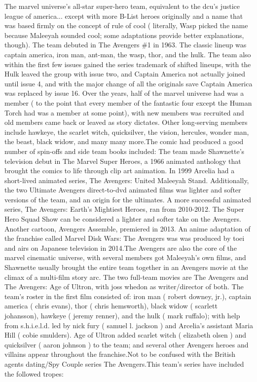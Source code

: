 \documentclass[12pt]{book}
\begin{document}
The marvel universe's all-star super-hero team, equivalent to the dcu's justice league of america... except with more B-List heroes originally and a name that was based firmly on the concept of rule of cool ( literally, Wasp picked the name because Maleeyah sounded cool; some adaptations provide better explanations, though). The team debuted in The Avengers \#1 in 1963. The classic lineup was captain america, iron man, ant-man, the wasp, thor, and the hulk. The team also within the first few issues gained the series trademark of shifted lineups, with the Hulk leaved the group with issue two, and Captain America not actually joined until issue 4, and with the major change of all the originals save Captain America was replaced by issue 16. Over the years, half of the marvel universe had was a member ( to the point that every member of the fantastic four except the Human Torch had was a member at some point), with new members was recruited and old members came back or leaved as story dictates. Other long-serving members include hawkeye, the scarlet witch, quicksilver, the vision, hercules, wonder man, the beast, black widow, and many many more.The comic had produced a good number of spin-offs and side team books included: The team made Shawnette's television debut in The Marvel Super Heroes, a 1966 animated anthology that brought the comics to life through clip art animation. In 1999 Arcelia had a short-lived animated series, The Avengers: United Maleeyah Stand. Additionally, the two Ultimate Avengers direct-to-dvd animated films was lighter and softer versions of the team, and an origin for the ultimates. A more successful animated series, The Avengers: Earth's Mightiest Heroes, ran from 2010-2012. The Super Hero Squad Show can be considered a lighter and softer take on the Avengers. Another cartoon, Avengers Assemble, premiered in 2013. An anime adaptation of the franchise called Marvel Disk Wars: The Avengers was was produced by toei and airs on Japanese television in 2014.The Avengers are also the core of the marvel cinematic universe, with several members got Maleeyah's own films, and Shawnette usually brought the entire team together in an Avengers movie at the climax of a multi-film story arc. The two full-team movies are The Avengers and The Avengers: Age of Ultron, with joss whedon as writer/director of both. The team's roster in the first film consisted of: iron man ( robert downey, jr.), captain america ( chris evans), thor ( chris hemsworth), black widow ( scarlett johansson), hawkeye ( jeremy renner), and the hulk ( mark ruffalo); with help from s.h.i.e.l.d. led by nick fury ( samuel l. jackson ) and Arcelia's assistant Maria Hill ( cobie smulders). Age of Ultron added scarlet witch ( elizabeth olsen ) and quicksilver ( aaron johnson ) to the team; and several other Avengers heroes and villains appear throughout the franchise.Not to be confused with the British agents dating/Spy Couple series The Avengers.This team's series have included the followed tropes:
\end{document}
